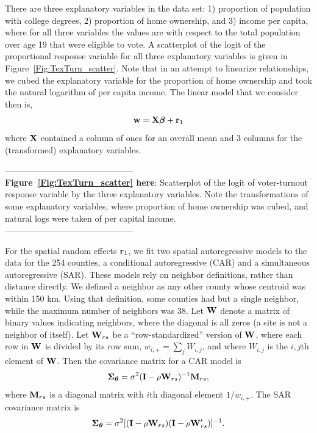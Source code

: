 \documentclass[12pt, titlepage]{article}
\begin{document}
There are three explanatory variables in the data set: 1) proportion of population with college degrees, 2) proportion of home ownership, and 3) income per capita, where for all three variables the values are with respect to the total population over age 19 that were eligible to vote.  A scatterplot of the logit of the proportional response variable for all three explanatory variables is given in Figure~\ref{Fig:TexTurn_scatter}.  Note that in an attempt to linearize relationships, we cubed the explanatory variable for the proportion of home ownership and took the natural logarithm of per capita income. The linear model that we consider then is,
$$
\mathbf{w} = \mathbf{X}\boldsymbol{\beta} + \mathbf{r}_{1}
$$
where $\mathbf{X}$ contained a column of ones for an overall mean and 3 columns for the (transformed) explanatory variables.

\begin{spacing}{0.8}
\vspace{.4cm}
\noindent --------------------------------------------- \\
\textbf{Figure~\ref{Fig:TexTurn_scatter} here}: Scatterplot of the logit of voter-turnout response variable by the three explanatory variables.  Note the transformations of some explanatory variables, where proportion of home ownership was cubed, and natural logs were taken of per capital income. \\
--------------------------------------------- \\ 
\end{spacing}


For the spatial random effects $\mathbf{r}_{1}$, we fit two spatial autoregressive models to the data for the 254 counties, a conditional autoregressive (CAR) and a simultaneous autoregressive (SAR).  These models rely on neighbor definitions, rather than distance directly.  We defined a neighbor as any other county whose centroid was within 150 km.  Using that definition, some counties had but a single neighbor, while the maximum number of neighbors was 38.  Let $\mathbf{W}$ denote a matrix of binary values indicating neighbors, where the diagonal is all zeros (a site is not a neighbor of itself). Let $\mathbf{W}_{rs}$ be a ``row-standardized'' version of $\mathbf{W}$, where each row in $\mathbf{W}$ is divided by its row sum, $w_{i,+} = \sum_{j}W_{i,j}$, and where $W_{i,j}$ is the $i,j$th element of $\mathbf{W}$.  Then the covariance matrix for a CAR model is
$$
\mbox{\boldmath $\Sigma$}_{\boldsymbol{\theta}} = \sigma^{2}(\mathbf{I} - \rho\mathbf{W}_{rs})^{-1}\mathbf{M}_{rs},
$$
where $\mathbf{M}_{rs}$ is a diagonal matrix with $i$th diagonal element $1/w_{i,+}$.  The SAR covariance matrix is
$$
\mbox{\boldmath $\Sigma$}_{\boldsymbol{\theta}} = \sigma^{2}[(\mathbf{I} - \rho\mathbf{W}_{rs})(\mathbf{I} - \rho\mathbf{W}_{rs}^{\prime})]^{-1}.
$$
\end{document}
